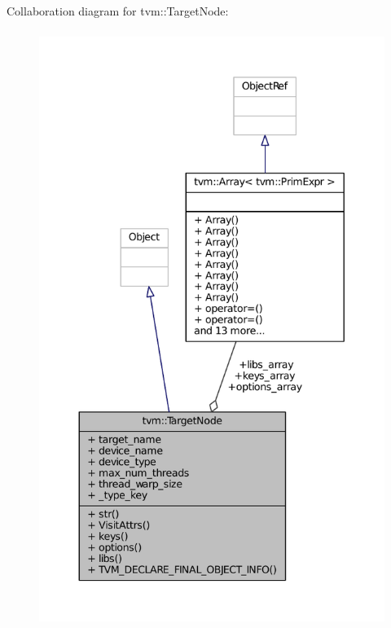 Collaboration diagram for tvm\+:\+:Target\+Node\+:
\nopagebreak
\begin{figure}[H]
\begin{center}
\leavevmode
\includegraphics[height=550pt]{classtvm_1_1TargetNode__coll__graph}
\end{center}
\end{figure}
